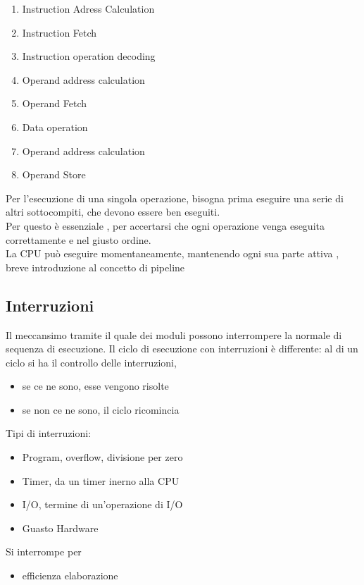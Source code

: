 \documentclass[12pt, a4paper]{article}
\begin{document}
\begin{enumerate}
	\item Instruction Adress Calculation
	\item Instruction Fetch
	\item Instruction operation decoding
	\item Operand address calculation
	\item Operand Fetch
	\item Data operation
	\item Operand address calculation 
	\item Operand Store
\end{enumerate}
Per l'esecuzione di una singola operazione, bisogna prima eseguire una serie
di altri sottocompiti, che devono essere ben eseguiti. \\
Per questo è essenziale , per accertarsi che
ogni operazione venga eseguita correttamente e nel giusto ordine.\\
La CPU può eseguire  momentaneamente, mantenendo ogni sua parte attiva
, breve introduzione al concetto di pipeline


\subsection{Interruzioni}
Il meccansimo tramite il quale dei moduli possono interrompere la normale di sequenza di esecuzione. \newline
Il ciclo di esecuzione con interruzioni è differente: al 
di un ciclo si ha il controllo delle interruzioni,

\begin{itemize}
	\item se ce ne sono, esse vengono risolte
	\item se non ce ne sono, il ciclo ricomincia
\end{itemize}

Tipi di interruzioni:
\begin{itemize}
	\item Program, overflow, divisione per zero
	\item Timer, da un timer inerno alla CPU
	\item I/O, termine di un'operazione di I/O
	\item Guasto Hardware
	\end{itemize}
Si interrompe per
\begin{itemize}
	\item efficienza elaborazione
\end{itemize}
\end{document}
